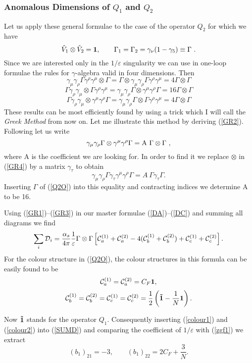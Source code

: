 \documentclass[12pt,rotate]{article}
\def\as{\alpha_s}
\newcommand{\be}{\begin{equation}}
\newcommand{\ee}{\end{equation}}
\begin{document}
\begin{itemize}
\begin{itemize}
\begin{itemize}
\subsubsection{Anomalous Dimensions of $Q_1$ and $Q_2$}
Let us apply these general formulae to the case of the operator
$Q_2$ for which we have
\be\label{Q2O}
\hat V_1\otimes\hat V_2 ={\bf 1},\quad\quad
\Gamma_1=\Gamma_2=\gamma_\nu(1-\gamma_5)\equiv\Gamma~.
\ee
Since we are interested only in the $1/\varepsilon$ singularity
we can use in one-loop formulae the rules for $\gamma$-algebra
valid in four dimensions.
Then
\be\label{GR1}
\gamma_\mu\gamma_\rho\Gamma\gamma^\rho\gamma^\mu \otimes \Gamma
=\Gamma\otimes\gamma_\mu\gamma_\rho\Gamma\gamma^\rho\gamma^\mu 
=4 \Gamma\otimes\Gamma
\ee
\be\label{GR2}
\Gamma\gamma_\rho\gamma_\mu\otimes\Gamma\gamma^\rho\gamma^\mu 
=\gamma_\mu\gamma_\rho\Gamma\otimes\gamma^\mu\gamma^\rho\Gamma 
=16 \Gamma\otimes\Gamma
\ee
\be\label{GR3}
\Gamma\gamma_\rho\gamma_\mu\otimes\gamma^\mu\gamma^\rho\Gamma 
=\gamma_\mu\gamma_\rho\Gamma\otimes\Gamma\gamma^\rho\gamma^\mu 
=4 \Gamma\otimes\Gamma
\ee
These results can be most efficiently found by using a trick which
I will call the {\it Greek Method} \cite{GREEK} from now on.
Let me illustrate this method by 
deriving (\ref{GR2}). Following \cite{GREEK} let us write
\be\label{GR4}
\gamma_\mu\gamma_\rho\Gamma\otimes\gamma^\mu\gamma^\rho\Gamma =
{\rm A}~\Gamma\otimes\Gamma~,
\ee
where A is the coefficient we are looking for.
In order to find it we replace $\otimes$ in (\ref{GR4})
by a matrix $\gamma_\tau$ to obtain
\be\label{GR5}
\gamma_\mu\gamma_\rho\Gamma\gamma_\tau\gamma^\mu\gamma^\rho\Gamma =
A~\Gamma\gamma_\tau\Gamma.
\ee 
Inserting $\Gamma$ of (\ref{Q2O}) into this equality and contracting
indices we determine A to be 16.

Using (\ref{GR1})--(\ref{GR3}) in our master formulae 
(\ref{DA})--(\ref{DC}) and summing all diagrams we find
\be\label{SUMD}
\sum_i {\cal D}_i=\frac{\as}{4\pi} \frac{1}{\varepsilon}
\Gamma\otimes\Gamma
\left[{\cal C}_a^{(1)}+{\cal C}_a^{(2)}-
4 ({\cal C}_b^{(1)}+{\cal C}_b^{(2)})+
{\cal C}_c^{(1)}+{\cal C}_c^{(2)}\right].
\ee
For the colour structure in (\ref{Q2O}), the colour structures in this formula
can be easily found to be 
\be\label{colour1}
{\cal C}_a^{(1)}={\cal C}_a^{(2)}=C_F {\bf 1},
\ee
\be\label{colour2}
{\cal C}_b^{(1)}={\cal C}_b^{(2)}={\cal C}_c^{(1)}={\cal C}_c^{(2)}
=\frac{1}{2}\left({\bf \tilde 1}-\frac{1}{N}{\bf 1}\right).
\ee

Now ${\bf\tilde 1}$ stands for the operator $Q_1$. Consequently
inserting (\ref{colour1}) and (\ref{colour2}) into (\ref{SUMD})
and comparing the coefficient of $1/\varepsilon$ with (\ref{zgf1})
we extract
\be\label{b22a}
(b_1)_{21}=-3,
\quad\quad
(b_1)_{22}=2 C_F+\frac{3}{N}.
\ee


\end{itemize}
\end{itemize}
\end{itemize}
\end{document}
